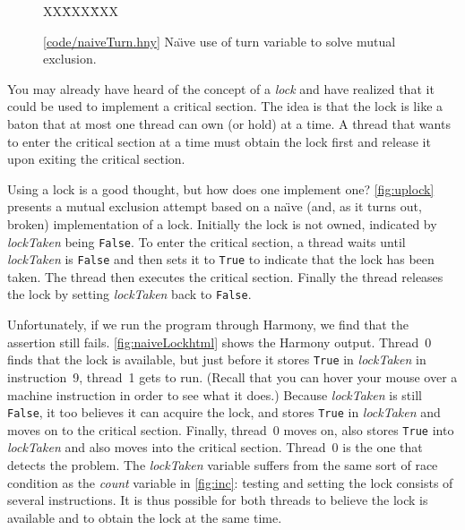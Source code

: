 \documentclass{report}
\newcommand{\harmonysource}[1]{
\begin{tabbing}
XX\=XXX\=XXX\kill
    
\end{tabbing}
}
\newcommand{\harmonylink}[1]{%
[\href{https://harmony.cs.cornell.edu/#1}{\underline{#1}}]%
}
\newenvironment{code}{
\tcolorbox
}{
\endtcolorbox
}
\begin{document}
\begin{figure}
\begin{code}
\harmonysource{naiveTurn}
\end{code}
\caption{\harmonylink{code/naiveTurn.hny} Na\"{\i}ve use of turn variable to solve mutual exclusion.}
\label{fig:upturn}
\end{figure}

%

You may already have heard of the concept of a \emph{lock}
%
and have realized that
it could be used to implement a critical section.
The idea is that the lock is like a baton that at most one thread can own
(or hold) at a time.
A thread that wants to enter the critical section at a time must obtain the
lock first and release it upon exiting the critical section.

Using a lock is a good thought, but how does one implement one?
\autoref{fig:uplock} presents a mutual exclusion attempt based on a
na\"{\i}ve (and, as it turns out, broken) implementation of a lock.
Initially the lock is not owned, indicated by \textit{lockTaken} being \texttt{False}.
To enter the critical section, a thread waits until \textit{lockTaken} is \texttt{False}
and then sets it to \texttt{True} to indicate that the lock has been taken.
The thread then executes the critical section.  Finally the thread
releases the lock by setting \textit{lockTaken} back to \texttt{False}.

Unfortunately, if we run the program through Harmony,
we find that the assertion still fails.
\autoref{fig:naiveLockhtml} shows the Harmony output.
Thread~0 finds that the lock is available, but just before it stores
\texttt{True} in \textit{lockTaken} in instruction~9, thread~1 gets
to run.
(Recall that you can hover your mouse over a machine instruction in order
to see what it does.)
Because \textit{lockTaken} is still \texttt{False}, it too
believes it can acquire the lock, and stores \texttt{True} in
\textit{lockTaken} and moves on to the critical section.
Finally, thread~0 moves on, also stores \texttt{True}
into \textit{lockTaken} and also moves
into the critical section.  Thread~0 is the one that detects the
problem.
The \textit{lockTaken} variable
suffers from the same sort of race condition as the \textit{count} variable
in \autoref{fig:inc}: testing and setting the lock
consists of several instructions.  It is thus possible
for both threads to believe the lock is available and to obtain the lock
at the same time.
\end{document}

